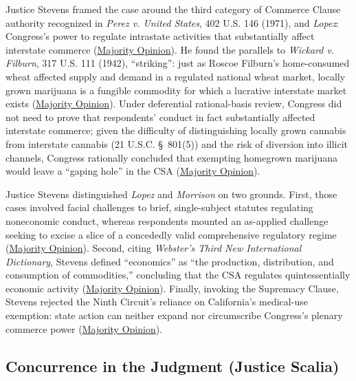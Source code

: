 \documentclass[12pt]{article}
\begin{document}
Justice Stevens framed the case around the third category of Commerce Clause authority recognized in \textit{Perez v. United States}, 402 U.S. 146 (1971), and \textit{Lopez}: Congress's power to regulate intrastate activities that substantially affect interstate commerce (\href{https://www.law.cornell.edu/supct/html/03-1454.ZO.html}{Majority Opinion}). He found the parallels to \textit{Wickard v. Filburn}, 317 U.S. 111 (1942), ``striking'': just as Roscoe Filburn's home-consumed wheat affected supply and demand in a regulated national wheat market, locally grown marijuana is a fungible commodity for which a lucrative interstate market exists (\href{https://www.law.cornell.edu/supct/html/03-1454.ZO.html}{Majority Opinion}). Under deferential rational-basis review, Congress did not need to prove that respondents' conduct in fact substantially affected interstate commerce; given the difficulty of distinguishing locally grown cannabis from interstate cannabis (21 U.S.C. \S\ 801(5)) and the risk of diversion into illicit channels, Congress rationally concluded that exempting homegrown marijuana would leave a ``gaping hole'' in the CSA (\href{https://www.law.cornell.edu/supct/html/03-1454.ZO.html}{Majority Opinion}).

Justice Stevens distinguished \textit{Lopez} and \textit{Morrison} on two grounds. First, those cases involved facial challenges to brief, single-subject statutes regulating noneconomic conduct, whereas respondents mounted an as-applied challenge seeking to excise a slice of a concededly valid comprehensive regulatory regime (\href{https://www.law.cornell.edu/supct/html/03-1454.ZO.html}{Majority Opinion}). Second, citing \textit{Webster's Third New International Dictionary}, Stevens defined ``economics'' as ``the production, distribution, and consumption of commodities,'' concluding that the CSA regulates quintessentially economic activity (\href{https://www.law.cornell.edu/supct/html/03-1454.ZO.html}{Majority Opinion}). Finally, invoking the Supremacy Clause, Stevens rejected the Ninth Circuit's reliance on California's medical-use exemption: state action can neither expand nor circumscribe Congress's plenary commerce power (\href{https://www.law.cornell.edu/supct/html/03-1454.ZO.html}{Majority Opinion}).

\subsection{Concurrence in the Judgment (Justice Scalia)}
\end{document}
